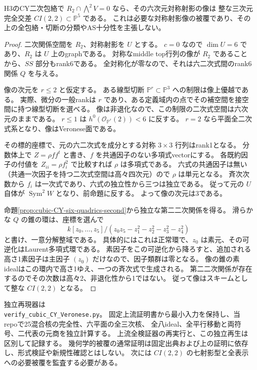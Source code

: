 \begin{theorem}[零交換子CYの必要完全交差像]\label{thm:cubic-CY-zero-commutator-CI22}
H3のCY二次包絡で $R_2\cap\bigwedge^2V=0$ なら、その六次元対称射影の像は
整な三次元完全交差 $CI(2,2)\subset\mathbb P^5$ である。
これは必要な対称射影像の被覆であり、その上の全包絡・切断の分類やAS十分性を主張しない。
\end{theorem}
\begin{proof}
二次関係空間を $R_2$、対称射影を $U$ とする。
$c=0$ なので $\dim U=6$ であり、$R_2$ は $U$ 上のgraphである。
対称なmiddle top行列の像が $R_2$ であることから、$SS$ 部分もrank6である。
全対称化が零なので、それは六二次式間のrank6関係 $Q$ を与える。

像の次元を $r\le2$ と仮定する。
ある線型切断 $\mathbb P^r\subset\mathbb P^3$ への制限は像上優越である。
実際、微分の一般rankは $r$ であり、ある定義域内の点でその補空間を接空間に持つ線型切断を選べる。
像は非退化なので、この制限の二次式空間は六次元のままである。
$r\le1$ は $h^0(\mathcal O_{\mathbb P^r}(2))<6$ に反する。
$r=2$ なら平面全二次式系となり、像はVeronese面である。

その標的座標で、元の六二次式を成分とする対称 $3\times3$ 行列はrank1となる。
分数体上で $Z=\rho ff^t$ と書き、$f$ を共通因子のない多項式vectorにする。
各既約因子の付値を $Z_{ii}=\rho f_i^2$ で比較すれば $\rho$ は多項式である。
六式の共通因子は無い（共通一次因子を持つ二次式空間は高々四次元）ので $\rho$ は単元となる。
斉次次数から $f_i$ は一次式であり、六式の独立性から三つは独立である。
従って元の $U$ 自体が $\operatorname{Sym}^2W$ となり、前命題に反する。
よって像の次元は3である。

命題\ref{prop:cubic-CY-six-quadrics-second}から独立な第二二次関係を得る。
滑らかな $Q$ の錐の環は、座標を選んで
\[
 k[z_0,\ldots,z_5]/(z_0z_5-z_1^2-z_2^2-z_3^2-z_4^2)
\]
と書け、一意分解整域である。
具体的にはこれは正常環で、$z_0$ は素元、その可逆化はLaurent多項式環である。
素因子をこの可逆化から降ろすと、追加される高さ1素因子は主因子 $(z_0)$ だけなので、因子類群は零となる。
像の錐の素idealはこの環内で高さ1ゆえ、一つの斉次式で生成される。
第二二次関係が存在するのでその次数は高々2、非退化性から1ではない。
従って像はスキームとして整な $CI(2,2)$ となる。
\end{proof}

独立再現器は\\
\texttt{verify\_cubic\_CY\_Veronese.py}。
固定上流証明書から最小入力を保持し、当repoで25混合核の完全性、六平面の全三次核、
全八ideal、全平行移動と両符号、二代表の元商を独立計算する。
上流全検証器の再実行と、この独立再生は区別して記録する。
幾何学的被覆の通常証明は固定出典および上の証明に依存し、形式検証や新規性確認とはしない。
次には $CI(2,2)$ の七射影型と全表示への必要被覆を監査する必要がある。
